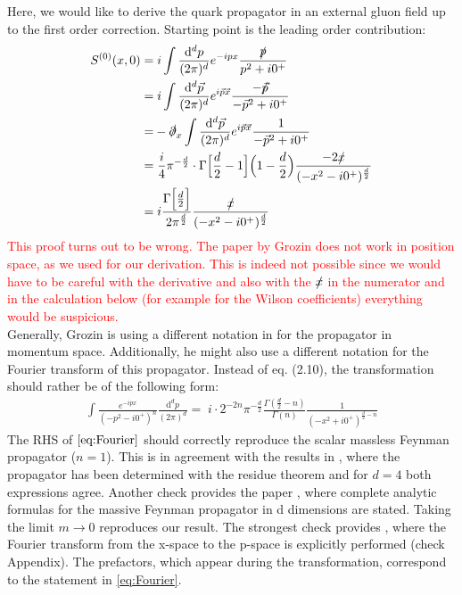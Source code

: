 \documentclass[openright,twoside,12pt,a4paper,final]{article}
\begin{document}
	\noindent
	Here, we would like to derive the quark propagator in an external gluon field up to the first order correction. Starting point is the leading order contribution:
	\begin{align}
		S^{(0)} (x,0) =& \; i \int \frac{\mathrm{d}^dp}{(2 \pi)^d} e^{-ipx} \frac{\slashed{p}}{p^2 + i 0^+} \nonumber \\ =& \; i \int \frac{\mathrm{d}^d \vec{p}}{(2 \pi)^d} e^{i\vec{p} \vec{x}} \frac{- \slashed{\vec{p}}}{- \vec{p}^2 + i 0^+} \nonumber \\ =& - \slashed{\partial}_x \int \frac{\mathrm{d}^d \vec{p}}{(2 \pi)^d} e^{i\vec{p} \vec{x}} \frac{1}{- \vec{p}^2 + i 0^+} \nonumber \\ =& \; \frac{i}{4} \pi^{-\frac{d}{2}} \cdot \Gamma\Big[\frac{d}{2} - 1\Big] \Big(1 - \frac{d}{2}\Big) \frac{-2 \slashed{x}}{(-x^2 - i0^+)^{\frac{d}{2}}} \nonumber \\ =& \; i \frac{\Gamma\Big[\frac{d}{2}\Big]}{2 \pi^{\frac{d}{2}}} \frac{\slashed{x}}{(-x^2 - i0^+)^{\frac{d}{2}}}
	\end{align}
	\textcolor{red}{This proof turns out to be wrong. The paper by Grozin does not work in position space, as we used for our derivation. This is indeed not possible since we would have to be careful with the derivative and also with the $\slashed{x}$ in the numerator and in the calculation below (for example for the Wilson coefficients) everything would be suspicious.} \\
	Generally, Grozin is using a different notation in \cite{grozin2000lectures} for the propagator in momentum space. Additionally, he might also use a different notation for the Fourier transform of this propagator. Instead of eq. (2.10), the transformation should rather be of the following form:
	\begin{align}
		\int \frac{e^{-ipx}}{(-p^2 - i0^+)^n} \frac{\mathrm{d}^d p}{(2 \pi)^d} = \; i \cdot 2^{-2n} \pi^{-\frac{d}{2}} \frac{\Gamma(\frac{d}{2} - n)}{\Gamma(n)} \frac{1}{(-x^2 + i0^+)^{\frac{d}{2} - n}} \label{eq:Fourier}
	\end{align}
	The RHS of $\eqref{eq:Fourier}$ should correctly reproduce the scalar massless Feynman propagator ($n = 1$). This is in agreement with the results in \cite{HomeworkRastelli}, where the propagator has been determined with the residue theorem and for $d = 4$ both expressions agree. Another check provides the paper \cite{Hong_Hao_2010}, where complete analytic formulas for the massive Feynman propagator in d dimensions are stated. Taking the limit $m \rightarrow 0$ reproduces our result. The strongest check provides \cite{Novikov:1983gd}, where the Fourier transform from the x-space to the p-space is explicitly performed (check Appendix). The prefactors, which appear during the transformation, correspond to the statement in \eqref{eq:Fourier}. \\
\end{document}
